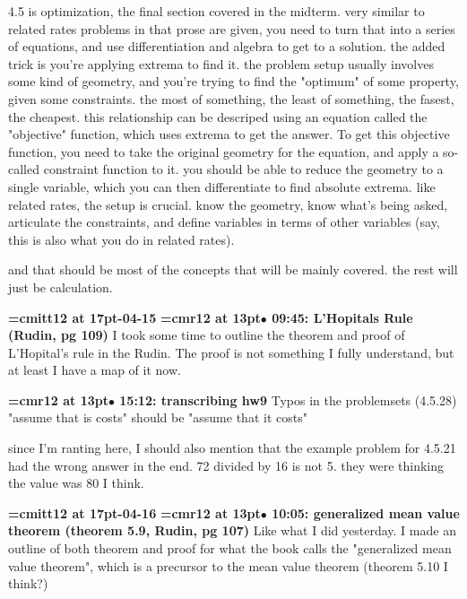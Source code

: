 4.5 is optimization, the final section covered in the midterm. very similar to related rates problems in that prose are given, you need to turn that into a series of equations, and use differentiation and algebra to get to a solution. the added trick is you're applying extrema to find it. the problem setup usually involves some kind of geometry, and you're trying to find the "optimum" of some property, given some constraints. the most of something, the least of something, the fasest, the cheapest. this relationship can be descriped using an equation called the "objective" function, which uses extrema to get the answer. To get this objective function, you need to take the original geometry for the equation, and apply a so-called constraint function to it. you should be able to reduce the geometry to a single variable, which you can then differentiate to find absolute extrema. like related rates, the setup is crucial. know the geometry, know what's being asked, articulate the constraints, and define variables in terms of other variables (say, this is also what you do in related rates).
\par

and that should be most of the concepts that will be mainly covered. the rest will just be calculation.
\par

{\medskip\noindent\bf\font\titlefont=cmitt12 at 17pt-04-15}\medskip
{\smallskip\noindent\bf\font\titlefont=cmr12 at 13pt\titlefont $\bullet$ 09:45: L'Hopitals Rule (Rudin, pg 109)}\smallskip
I took some time to outline the theorem and proof of L'Hopital's rule in the Rudin. The proof is not something I fully understand, but at least I have a map of it now.
\par

{\smallskip\noindent\bf\font\titlefont=cmr12 at 13pt\titlefont $\bullet$ 15:12: transcribing hw9}\smallskip
Typos in the problemsets (4.5.28) "assume that is costs" should be "assume that it costs"
\par

since I'm ranting here, I should also mention that the example problem for 4.5.21 had the wrong answer in the end. 72 divided by 16 is not 5. they were thinking the value was 80 I think.
\par

{\medskip\noindent\bf\font\titlefont=cmitt12 at 17pt-04-16}\medskip
{\smallskip\noindent\bf\font\titlefont=cmr12 at 13pt\titlefont $\bullet$ 10:05: generalized mean value theorem (theorem 5.9, Rudin, pg 107)}\smallskip
Like what I did yesterday. I made an outline of both theorem and proof for what the book calls the "generalized mean value theorem", which is a precursor to the mean value theorem (theorem 5.10 I think?)
\par

